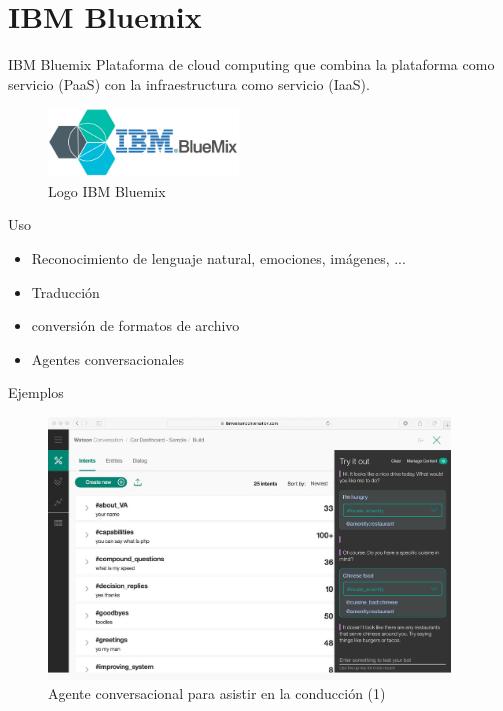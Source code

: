 \documentclass[compress]{beamer}
\begin{document}
\section{IBM Bluemix}
\begin{frame}{IBM Bluemix}
	Plataforma de cloud computing que combina la plataforma como servicio
	(PaaS) con la infraestructura como servicio (IaaS).
	\begin{figure}[H]
		\centering
		\label{ibm-bluemix.jpg}
		\includegraphics[width=0.45\textwidth]{./Imagenes/ibm-bluemix.jpg}
		\caption{Logo IBM Bluemix}
	\end{figure}

	\begin{exampleblock}{Uso}
		\begin{itemize}
			\item Reconocimiento de lenguaje natural, emociones, imágenes, ...
			\item Traducción
			\item conversión de formatos de archivo
			\item Agentes conversacionales
		\end{itemize}
	\end{exampleblock}
\end{frame}


\begin{frame}{Ejemplos}
	\begin{figure}[H]
		\centering
		\label{car1.jpg}
		\includegraphics[width=0.95\textwidth]{./Imagenes/car1.jpeg}
		\caption{Agente conversacional para asistir en la conducción (1)}
	\end{figure}
\end{frame}
\end{document}
